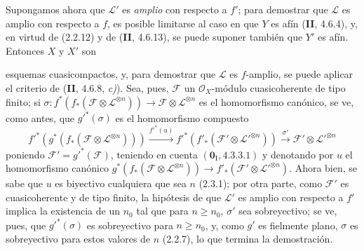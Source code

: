 Supongamos ahora que $\mathcal L'$ es \emph{amplio} con respecto a $f'$; para
demostrar que $\mathcal L$ es amplio con respecto a $f$, es posible limitarse
al caso en que $Y$ es afín (\textbf{II}, 4.6.4), y, en virtud de (2.2.12) y de (\textbf{II},
4.6.13), se puede suponer también que $Y'$ es afín. Entonces $X$ y $X'$ son

esquemas cuasicompactos, y, para demostrar que $\mathcal L$ es $f$-amplio,
se puede aplicar el criterio de (\textbf{II}, 4.6.8, \emph{c)}). Sea, pues, $\mathcal F$ un
$\mathcal O_X$-módulo cuasicoherente de tipo finito; si
$\sigma:f^*(f_*(\mathcal F\otimes\mathcal L^{\otimes n}))
\to\mathcal F\otimes\mathcal L^{\otimes n}$
es el homomorfismo canónico, se ve, como antes, que $g'^*(\sigma)$ es el
homomorfismo compuesto
\[
f'^*(g^*(f_*(\mathcal F\otimes\mathcal L^{\otimes n})))
\xrightarrow{f'^*(u)}f'^*(f'_*(\mathcal F'\otimes
\mathcal L'^{\otimes n}))\xrightarrow{\sigma'}
\mathcal F'\otimes\mathcal L'^{\otimes n}
\]
poniendo $\mathcal F'=g'^*(\mathcal F)$, teniendo en cuenta
$(\mathbf{0}_{\mathrm I},4.3.3.1)$ y denotando por $u$ el homomorfismo canónico
$g^*(f_*(\mathcal F\otimes\mathcal L^{\otimes n}))
\to f'_*(\mathcal F'\otimes\mathcal L'^{\otimes n})$.
Ahora bien, se sabe que $u$ es biyectivo cualquiera que sea $n$ (2.3.1); por
otra parte, como $\mathcal F'$ es cuasicoherente y de tipo finito, la
hipótesis de que $\mathcal L'$ es amplio con respecto a $f'$ implica la
existencia de un $n_0$ tal que para $n\geq n_0$, $\sigma'$ sea sobreyectivo;
se ve, pues, que $g'^*(\sigma)$ es sobreyectivo para $n\geq n_0$, y, como
$g'$ es fielmente plano, $\sigma$ es sobreyectivo para estos valores de $n$
(2.2.7), lo que termina la demostración.
